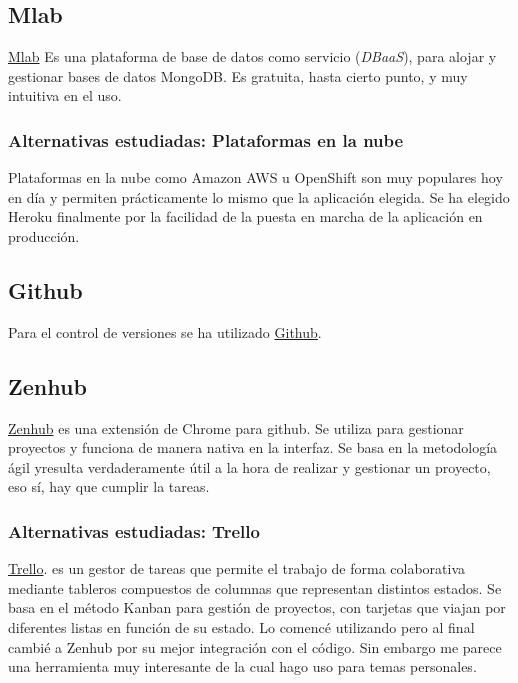  \subsection{Mlab}\label{mlab}
 \hyperlink{https://mlab.com/}{Mlab} Es una plataforma de base de datos como servicio (\emph{DBaaS}), para alojar y gestionar bases de datos MongoDB. Es gratuita, hasta cierto punto, y muy intuitiva en el uso.

  \subsubsection{Alternativas estudiadas: Plataformas en la nube}\label{tnube}
  Plataformas en la nube como Amazon AWS u OpenShift son muy populares hoy en día y permiten prácticamente lo mismo que la aplicación elegida. Se ha elegido Heroku finalmente por la facilidad de la puesta en marcha de la aplicación en producción.
  
   \subsection{Github}\label{github}
   Para el control de versiones se ha utilizado \hyperlink{https://www.github.com/}{Github}. 
   
    \subsection{Zenhub}\label{zenhub}
    \hyperlink{https://www.zenhub.io/}{Zenhub} es una extensión de Chrome para github. Se utiliza para gestionar proyectos y funciona de manera nativa en la interfaz. Se basa en la metodología ágil yresulta verdaderamente útil a la hora de realizar y gestionar un proyecto, eso sí, hay que cumplir la tareas. 
    
     \subsubsection{Alternativas estudiadas: Trello}\label{trello}
      \hyperlink{https://www.trello.com/}{Trello}.  es un gestor de tareas que permite el trabajo de forma colaborativa mediante tableros compuestos de columnas  que representan distintos estados. Se basa en el método Kanban para gestión de proyectos, con tarjetas que viajan por diferentes listas en función de su estado. Lo comencé utilizando pero al final cambié a Zenhub por su mejor integración con el código. Sin embargo me parece una herramienta muy interesante de la cual hago uso para temas personales. 
     
     




